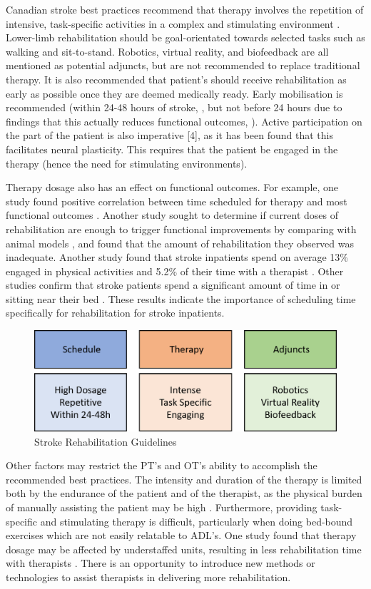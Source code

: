 \documentclass[12pt]{report}
\begin{document}
Canadian stroke best practices recommend that therapy involves the repetition of intensive, task-specific activities in a complex and stimulating environment \cite{Hebert2016}. Lower-limb rehabilitation should be goal-orientated towards selected tasks such as walking and sit-to-stand. Robotics, virtual reality, and biofeedback are all mentioned as potential adjuncts, but are not recommended to replace traditional therapy. It is also recommended that patient's should receive rehabilitation as early as possible once they are deemed medically ready. Early mobilisation is recommended (within 24-48 hours of stroke, \cite{Casaubon2016}, but not before 24 hours due to findings that this actually reduces functional outcomes, \cite{AVERTTrialCollaborationgroup2015}). Active participation on the part of the patient is also imperative [4], as it has been found that this facilitates neural plasticity. This requires that the patient be engaged in the therapy (hence the need for stimulating environments).

Therapy dosage also has an effect on functional outcomes. For example, one study found positive correlation between time scheduled for therapy and most functional outcomes \cite{Lohse2014}. Another study sought to determine if current doses of rehabilitation are enough to trigger functional improvements by comparing with animal models \cite{Lang2009}, and found that the amount of rehabilitation they observed was inadequate. Another study found that stroke inpatients spend on average 13\% engaged in physical activities and 5.2\% of their time with a therapist \cite{Bernhardt2004}. Other studies confirm that stroke patients spend a significant amount of time in or sitting near their bed \cite{King2011}. These results indicate the importance of scheduling time specifically for rehabilitation for stroke inpatients. 

	\begin{figure}[h] 
		\centering
		\includegraphics[width=0.75\linewidth]{guidelines}
		\caption{Stroke Rehabilitation Guidelines}
		\label{fig:guidelines}
	\end{figure}

Other factors may restrict the PT's and OT's ability to accomplish the recommended best practices. The intensity and duration of the therapy is limited both by the endurance of the patient and of the therapist, as the physical burden of manually assisting the patient may be high \cite{Colombo}. Furthermore, providing task-specific and stimulating therapy is difficult, particularly when doing bed-bound exercises which are not easily relatable to ADL's. One study found that therapy dosage may be affected by understaffed units, resulting in less rehabilitation time with therapists \cite{Mchugh2013}. There is an opportunity to introduce new methods or technologies to assist therapists in delivering more rehabilitation.
\end{document}
